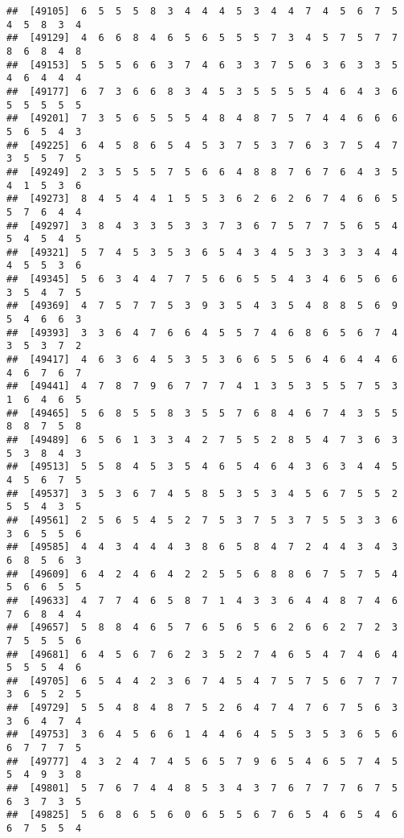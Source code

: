 \documentclass[
]{book}
\begin{document}
\begin{verbatim}
##  [49105]  6  5  5  5  8  3  4  4  4  5  3  4  4  7  4  5  6  7  5  4  5  8  3  4
##  [49129]  4  6  6  8  4  6  5  6  5  5  5  7  3  4  5  7  5  7  7  8  6  8  4  8
##  [49153]  5  5  5  6  6  3  7  4  6  3  3  7  5  6  3  6  3  3  5  4  6  4  4  4
##  [49177]  6  7  3  6  6  8  3  4  5  3  5  5  5  5  4  6  4  3  6  5  5  5  5  5
##  [49201]  7  3  5  6  5  5  5  4  8  4  8  7  5  7  4  4  6  6  6  5  6  5  4  3
##  [49225]  6  4  5  8  6  5  4  5  3  7  5  3  7  6  3  7  5  4  7  3  5  5  7  5
##  [49249]  2  3  5  5  5  7  5  6  6  4  8  8  7  6  7  6  4  3  5  4  1  5  3  6
##  [49273]  8  4  5  4  4  1  5  5  3  6  2  6  2  6  7  4  6  6  5  5  7  6  4  4
##  [49297]  3  8  4  3  3  5  3  3  7  3  6  7  5  7  7  5  6  5  4  5  4  5  4  5
##  [49321]  5  7  4  5  3  5  3  6  5  4  3  4  5  3  3  3  3  4  4  4  5  5  3  6
##  [49345]  5  6  3  4  4  7  7  5  6  6  5  5  4  3  4  6  5  6  6  3  5  4  7  5
##  [49369]  4  7  5  7  7  5  3  9  3  5  4  3  5  4  8  8  5  6  9  5  4  6  6  3
##  [49393]  3  3  6  4  7  6  6  4  5  5  7  4  6  8  6  5  6  7  4  3  5  3  7  2
##  [49417]  4  6  3  6  4  5  3  5  3  6  6  5  5  6  4  6  4  4  6  4  6  7  6  7
##  [49441]  4  7  8  7  9  6  7  7  7  4  1  3  5  3  5  5  7  5  3  1  6  4  6  5
##  [49465]  5  6  8  5  5  8  3  5  5  7  6  8  4  6  7  4  3  5  5  8  8  7  5  8
##  [49489]  6  5  6  1  3  3  4  2  7  5  5  2  8  5  4  7  3  6  3  5  3  8  4  3
##  [49513]  5  5  8  4  5  3  5  4  6  5  4  6  4  3  6  3  4  4  5  4  5  6  7  5
##  [49537]  3  5  3  6  7  4  5  8  5  3  5  3  4  5  6  7  5  5  2  5  5  4  3  5
##  [49561]  2  5  6  5  4  5  2  7  5  3  7  5  3  7  5  5  3  3  6  3  6  5  5  6
##  [49585]  4  4  3  4  4  4  3  8  6  5  8  4  7  2  4  4  3  4  3  6  8  5  6  3
##  [49609]  6  4  2  4  6  4  2  2  5  5  6  8  8  6  7  5  7  5  4  5  6  6  5  5
##  [49633]  4  7  7  4  6  5  8  7  1  4  3  3  6  4  4  8  7  4  6  7  6  8  4  4
##  [49657]  5  8  8  4  6  5  7  6  5  6  5  6  2  6  6  2  7  2  3  7  5  5  5  6
##  [49681]  6  4  5  6  7  6  2  3  5  2  7  4  6  5  4  7  4  6  4  5  5  5  4  6
##  [49705]  6  5  4  4  2  3  6  7  4  5  4  7  5  7  5  6  7  7  7  3  6  5  2  5
##  [49729]  5  5  4  8  4  8  7  5  2  6  4  7  4  7  6  7  5  6  3  3  6  4  7  4
##  [49753]  3  6  4  5  6  6  1  4  4  6  4  5  5  3  5  3  6  5  6  6  7  7  7  5
##  [49777]  4  3  2  4  7  4  5  6  5  7  9  6  5  4  6  5  7  4  5  5  4  9  3  8
##  [49801]  5  7  6  7  4  4  8  5  3  4  3  7  6  7  7  7  6  7  5  6  3  7  3  5
##  [49825]  5  6  8  6  5  6  0  6  5  5  6  7  6  5  4  6  5  4  6  6  7  5  5  4

\end{verbatim}
\end{document}
